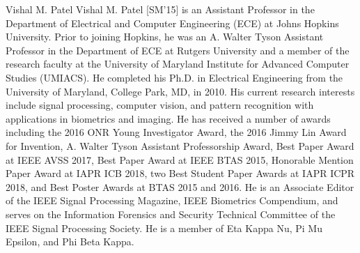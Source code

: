 \documentclass[journal]{IEEEtran}
\begin{document}
\begin{IEEEbiography}{Vishal M. Patel}
Vishal M. Patel [SM'15] is an Assistant Professor in the Department of Electrical and Computer Engineering (ECE) at Johns Hopkins University.  Prior to joining Hopkins, he was an A. Walter Tyson Assistant Professor in the Department of ECE at Rutgers University and a member of the research faculty at the University of Maryland Institute for Advanced Computer Studies (UMIACS). He completed his Ph.D. in Electrical Engineering from the University of Maryland, College Park, MD, in 2010. His current research interests include signal processing, computer vision, and pattern recognition with applications in biometrics and imaging. He has received a number of awards including the 2016 ONR Young Investigator Award, the 2016 Jimmy Lin Award for Invention, A. Walter Tyson Assistant Professorship Award, Best Paper Award at IEEE AVSS 2017, Best Paper Award at IEEE BTAS 2015, Honorable Mention Paper Award at IAPR ICB 2018, two Best Student Paper Awards at IAPR ICPR 2018, and Best Poster Awards at BTAS 2015 and 2016. He is an Associate Editor of the IEEE Signal Processing Magazine, IEEE Biometrics Compendium, and serves on the Information Forensics and Security Technical Committee of the IEEE Signal Processing Society. He is a member of Eta Kappa Nu, Pi Mu Epsilon, and Phi Beta Kappa.
\end{IEEEbiography}
\end{document}
